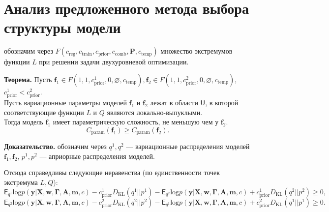 \section{Анализ предложенного метода выбора структуры модели}

обозначим через $F(c_{\text{reg}}, c_{\text{train}}, c_{\text{prior}}, c_{\text{comb}}, \mathbf{P}, c_{\text{temp}})$ множество экстремумов функции $L$ при решении задачи двухуровневой оптимизации.


\textbf{Теорема.}  
Пусть $\mathbf{f}_1 \in F(1, 1, c_{\text{prior}}^1, 0, \varnothing,  c_{\text{temp}} ), \mathbf{f}_2 \in F(1, 1, c_{\text{prior}}^2, 0, \varnothing,  c_{\text{temp}})$, $c_{\text{prior}}^1 < c_{\text{prior}}^2$.\\
Пусть вариационные параметры моделей $\mathbf{f}_1$ и $\mathbf{f}_2$ лежат в области $\mathsf{U}$, в которой соответствующие функции $L$ и $Q$ являются локально-выпуклыми.\\ 
Тогда модель $\mathbf{f}_1$ имеет параметрическую сложность, не меньшую чем у $\mathbf{f}_2$.
\[
    C_\text{param}(\mathbf{f}_1) \geq C_\text{param}(\mathbf{f}_2).
\]

\textbf{Доказательство.}
обозначим через $q^1, q^2$ --- вариационные распределения моделей $\mathbf{f}_1, \mathbf{f}_2$, 
$p^1, p^2$ --- априорные распределения моделей.
 
 Отсюда справедливы следующие неравенства (по единственности точек экстремума $L,Q$):
\[
    \mathsf{E}_{q^1}\text{log} p(\mathbf{y}|\mathbf{X},\mathbf{w}, \boldsymbol{\Gamma}, \mathbf{A},\mathbf{m}, c) - c_{\text{prior}}^1  D_\text{KL}(q^1||p^1)  -  \mathsf{E}_{q^2}\text{log} p(\mathbf{y}|\mathbf{X},\mathbf{w}, \boldsymbol{\Gamma}, \mathbf{A},\mathbf{m}, c) + c_{\text{prior}}^1  D_\text{KL}(q^2||p^2) \geq 0,
\]
\[
    \mathsf{E}_{q^2}\text{log} p(\mathbf{y}|\mathbf{X},\mathbf{w}, \boldsymbol{\Gamma}, \mathbf{A},\mathbf{m}, c) - c_{\text{prior}}^2  D_\text{KL}(q^2||p^2)  -  \mathsf{E}_{q^1}\text{log} p(\mathbf{y}|\mathbf{X},\mathbf{w}, \boldsymbol{\Gamma}, \mathbf{A},\mathbf{m}, c) + c_{\text{prior}}^2  D_\text{KL}(q^1||p^1) \geq 0.
\]


